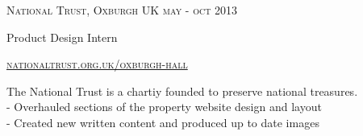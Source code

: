 {
  \textsc{\small{National Trust, Oxburgh UK
    \hfill
      {\raggedleft
        may - oct 2013
      } \\
    }
  }
  {\raggedright\large {
    Product Design Intern
  } \\}

  \textsc{\small\href{http://www.nationaltrust.org.uk/oxburgh-hall}{nationaltrust.org.uk/oxburgh-hall}}

  \normalsize{
    The National Trust is a chartiy founded to preserve national treasures.\\
    - Overhauled sections of the property website design and layout \\
    - Created new written content and produced up to date images
  }
}
